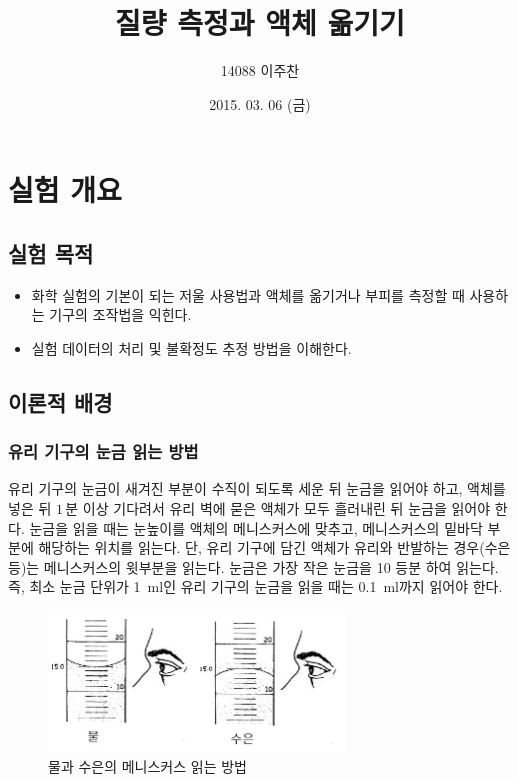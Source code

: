 \documentclass{GSHS-chemexp}
\begin{document}
	
	\title{질량 측정과 액체 옮기기}	
	\date{2015. 03. 06 (금)}
	\author{14088 이주찬}
	\maketitle
	
	\section{실험 개요}
	
	\subsection{실험 목적}
	
	\begin{itemize}
		\item 화학 실험의 기본이 되는 저울 사용법과 액체를 옮기거나
		부피를 측정할 때 사용하는 기구의 조작법을 익힌다.
		\item 실험 데이터의 처리 및 불확정도 추정 방법을 이해한다.
	\end{itemize}
	
	\subsection{이론적 배경}
	
	\subsubsection{유리 기구의 눈금 읽는 방법}
	유리 기구의 눈금이 새겨진 부분이 수직이 되도록 세운 뒤
	눈금을 읽어야 하고,	액체를 넣은 뒤 $1\,\mbox{분}$ 이상 기다려서
	유리 벽에 묻은 액체가 모두 흘러내린 뒤 눈금을 읽어야 한다.
	눈금을 읽을 때는 눈높이를 액체의 메니스커스에 맞추고,
	메니스커스의 밑바닥 부분에 해당하는 위치를 읽는다.
	단, 유리 기구에 담긴 액체가 유리와 반발하는 경우(수은 등)는
	메니스커스의 윗부분을 읽는다.
	눈금은 가장 작은 눈금을 10 등분 하여 읽는다.
	즉, 최소 눈금 단위가 \SI{1}{\milli\litre}인 유리 기구의
	눈금을 읽을 때는 \SI{0.1}{\milli\litre}까지 읽어야 한다.
	\begin{figure}[H]
		\centering
		\includegraphics[width=0.7\textwidth]{Meniscus.png}
		\caption{물과 수은의 메니스커스 읽는 방법}
		\label{fig:meniscus}
	\end{figure}
	
\end{document}
